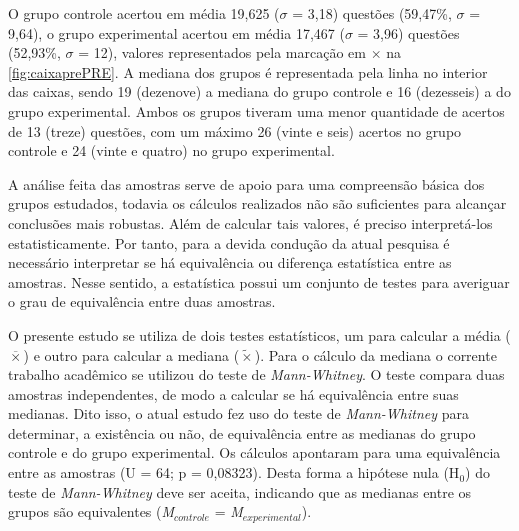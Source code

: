 O grupo controle acertou em média 19,625 ($\sigma$ = 3,18) questões (59,47\%, $\sigma$ = 9,64), o grupo experimental acertou em média 17,467 ($\sigma$ = 3,96) questões (52,93\%, $\sigma$ = 12), valores representados pela marcação em $\times$ na \autoref{fig:caixaprePRE}. A mediana dos grupos é representada pela linha no interior das caixas, sendo 19 (dezenove) a mediana do grupo controle e 16 (dezesseis) a do grupo experimental. Ambos os grupos tiveram uma menor quantidade de acertos de 13 (treze) questões, com um máximo 26 (vinte e seis) acertos no grupo controle e 24 (vinte e quatro) no grupo experimental.


A análise feita das amostras serve de apoio para uma compreensão básica dos grupos estudados, todavia os cálculos realizados não são suficientes para alcançar conclusões mais robustas. Além de calcular tais valores, é preciso interpretá-los estatisticamente. Por tanto, para a devida condução da atual pesquisa é necessário interpretar se há equivalência ou diferença estatística entre as amostras. Nesse sentido, a estatística possui um conjunto de testes para averiguar o grau de equivalência entre duas amostras. %

O presente estudo se utiliza de dois testes estatísticos, um para calcular a média ($\overline{\times}$) e outro para calcular a mediana ($\tilde{\times}$). Para o cálculo da mediana o corrente trabalho acadêmico se utilizou do teste de \textit{Mann-Whitney}. O teste compara duas amostras independentes, de modo a calcular se há equivalência entre suas medianas. Dito isso, o atual estudo fez uso do teste de \textit{Mann-Whitney} para determinar, a existência ou não, de equivalência entre as medianas do grupo controle e do grupo experimental. Os cálculos apontaram para uma equivalência entre as amostras (U = 64; p = 0,08323). Desta forma a hipótese nula (H$_0$) do teste de \textit{Mann-Whitney} deve ser aceita, indicando que as medianas entre os grupos são equivalentes (\textit{M}$_{controle}$ = \textit{M}$_{experimental}$). %

